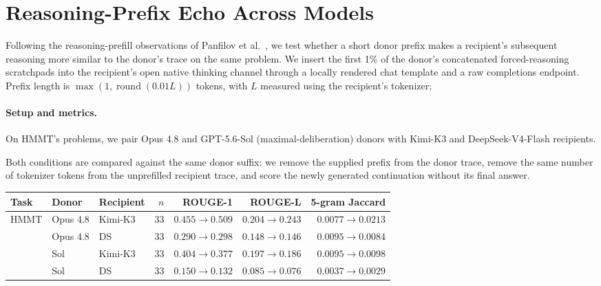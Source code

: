 \section{Reasoning-Prefix Echo Across Models}
\label{app:prefix-echo}

Following the reasoning-prefill observations of Panfilov et al.~\citep{panfilov2026stealing}, we test whether a short donor prefix makes a recipient's subsequent reasoning more similar to the donor's trace on the same problem.
We insert the first 1\% of the donor's concatenated forced-reasoning scratchpads into the recipient's open native thinking channel through a locally rendered chat template and a raw completions endpoint.
Prefix length is $\max(1,\operatorname{round}(0.01L))$ tokens, with $L$ measured using the recipient's tokenizer;
\paragraph{Setup and metrics.}
On HMMT's problems, we pair Opus 4.8 and GPT-5.6-Sol (maximal-deliberation) donors with Kimi-K3 and DeepSeek-V4-Flash recipients.

Both conditions are compared against the same donor suffix: we remove the supplied prefix from the donor trace, remove the same number of tokenizer tokens from the unprefilled recipient trace, and score the newly generated continuation without its final answer.

\par\medskip
\noindent\begin{minipage}{\textwidth}
\centering
{}
\label{tab:prefix-echo}
\scriptsize
\setlength{\tabcolsep}{3pt}
\begin{tabular}{lllrrrr}
\toprule
Task & Donor & Recipient & $n$ & ROUGE-1 & ROUGE-L & 5-gram Jaccard \\
\midrule
HMMT & Opus 4.8 & Kimi-K3 & 33 & $0.455\rightarrow0.509$ & $0.204\rightarrow0.243$ & $0.0077\rightarrow0.0213$ \\
 & Opus 4.8 & DS & 33 & $0.290\rightarrow0.298$ & $0.148\rightarrow0.146$ & $0.0095\rightarrow0.0084$ \\
 & Sol & Kimi-K3 & 33 & $0.404\rightarrow0.377$ & $0.197\rightarrow0.186$ & $0.0095\rightarrow0.0098$ \\
 & Sol & DS & 33 & $0.150\rightarrow0.132$ & $0.085\rightarrow0.076$ & $0.0037\rightarrow0.0029$ \\
\bottomrule
\end{tabular}
\end{minipage}
\par\medskip

